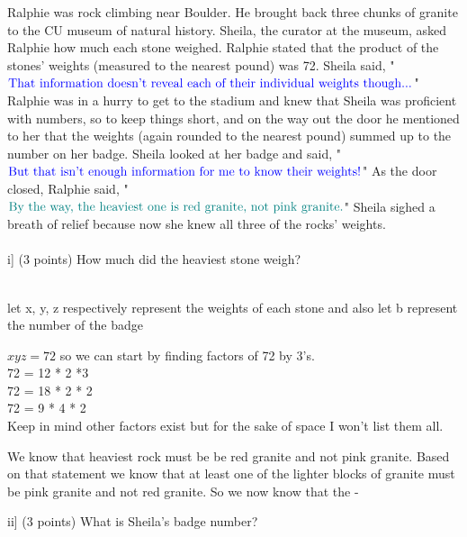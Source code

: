 \documentclass[9pt]{article}
\begin{document}




\vspace{5mm}

\item Ralphie was rock climbing near Boulder. He brought back three chunks of granite to the CU museum of natural history. Sheila, the curator at the museum, asked Ralphie how much each stone weighed. Ralphie stated that the product of the stones' weights (measured to the nearest pound) was 72. Sheila said, "$\color{blue}{\text{That information doesn't reveal each of their individual weights though...}}$" Ralphie was in a hurry to get to the stadium and knew that Sheila was proficient with numbers, so to keep things short, and on the way out the door he mentioned to her that the weights (again rounded to the nearest pound) summed up to the number on her badge. Sheila looked at her badge and said, "$\color{blue}{\text{But that isn't enough information for me to know their weights!}}$" As the door closed, Ralphie said, "$\color{teal}{\text{By the way, the heaviest one is red granite, not pink granite.}}$" Sheila sighed a breath of relief because now she knew all three of the rocks' weights.\\
\\
i] (3 points) How much did the heaviest stone weigh?\\
\\
\item let x, y, z respectively represent the weights of each stone and also let b represent the number of the badge
\item $xyz=72$ so we can start by finding factors of 72 by 3's. \\72 = 12 * 2 *3
\\72 = 18 * 2 * 2
\\72 = 9 * 4 * 2\\Keep in mind other factors exist but for the sake of space I won't list them all.

We know that heaviest rock must be be red granite and not pink granite. Based on that statement we know that at least one of the lighter blocks of  granite must be  pink granite and not red granite. So we now know that the 
-

ii] (3 points) What is Sheila's badge number?\\
\\
\vspace{5mm}
\end{document}
